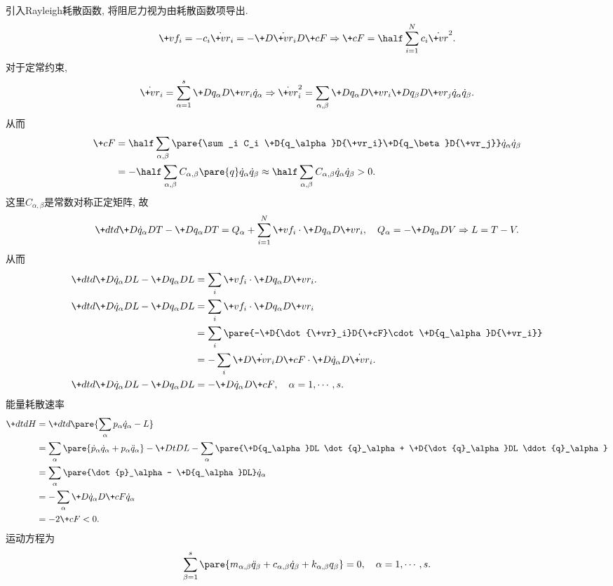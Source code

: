 \documentclass[../LectureNotes.tex]{subfiles}
\begin{document}
引入Rayleigh耗散函数, 将阻尼力视为由耗散函数项导出.
\[ \+vf_i = -c_i \dot{\+vr}_i = -\+D{\dot{\+vr}_i}D{\+cF} \Rightarrow \+cF = \half \sum_{i=1}^N c_i \dot{\+vr}^2. \]
对于定常约束,
\[ \dot{\+vr}_i = \sum_{\alpha=1}^s \+D{q_\alpha}D{\+vr_i} \dot{q}_\alpha \Rightarrow \dot{\+vr}_i^2 = \sum_{\alpha,\beta} \+D{q_\alpha}D{\+vr_i}\+D{q_\beta}D{\+vr_j}\dot{q}_\alpha \dot{q}_\beta. \]
从而
\begin{align*}
    \+cF &= \half\sum_{\alpha,\beta} \pare{\sum_i C_i \+D{q_\alpha}D{\+vr_i}\+D{q_\beta}D{\+vr_j}} \dot{q}_\alpha \dot{q}_\beta \\ &= -\half \sum_{\alpha,\beta} C_{\alpha,\beta}\pare{q} \dot{q}_\alpha \dot{q}_\beta \approx \half \sum_{\alpha,\beta} C_{\alpha,\beta} \dot{q}_\alpha \dot{q}_\beta > 0.
\end{align*}
这里$C_{\alpha,\beta}$是常数对称正定矩阵, 故
\[ \+dtd{} \+D{\dot{q}_\alpha}DT - \+D{q_\alpha}DT = Q_\alpha + \sum_{i=1}^N \+vf_i \cdot \+D{q_\alpha}D{\+vr_i},\quad Q_\alpha = -\+D{q_\alpha}DV \Rightarrow L=T-V. \]
从而
\begin{align*}
    \+dtd{} \+D{\dot{q}_\alpha}DL - \+D{q_\alpha}DL &= \sum_i \+vf_i \cdot \+D{q_\alpha}D{\+vr_i}. \\
    \+dtd{} \+D{\dot{q}_\alpha}DL - \+D{q_\alpha}DL &= \sum_i \+vf_i \cdot \+D{q_\alpha}D{\+vr_i} \\
    &= \sum_i \pare{-\+D{\dot{\+vr}_i}D{\+cF}\cdot \+D{q_\alpha}D{\+vr_i}} \\
    &= -\sum_i \+D{\dot{\+vr}_i}D{\+cF} \cdot \+D{\dot{q}_\alpha}D{\dot{\+vr}_i}. \\
    \+dtd{} \+D{\dot{q}_\alpha}DL - \+D{q_\alpha}DL &= - \+D{\dot{q}_\alpha}D{\+cF},\quad \alpha = 1,\cdots,s.
\end{align*}
能量耗散速率
\begin{align*}
    \+dtdH &= \+dtd{} \pare{\sum_\alpha p_\alpha \dot{q}_\alpha - L} \\
    &= \sum_\alpha \pare{\dot{p}_\alpha \dot{q}_\alpha + p_\alpha \ddot{q}_\alpha} - \+DtDL - \sum_\alpha\pare{\+D{q_\alpha}DL \dot{q}_\alpha + \+D{\dot{q}_\alpha}DL \ddot{q}_\alpha} \\
    &= \sum_\alpha \pare{\dot{p}_\alpha - \+D{q_\alpha}DL} \dot{q}_\alpha \\
    &= -\sum_\alpha \+D{\dot{q}_\alpha}D{\+cF} \dot{q}_\alpha \\
    &= -2\+cF < 0.
\end{align*}
运动方程为
\[ \sum_{\beta = 1}^s \pare{m_{\alpha,\beta}\ddot{q}_\beta + c_{\alpha,\beta}\dot{q}_\beta + k_{\alpha,\beta}q_\beta} = 0,\quad \alpha = 1,\cdots,s. \]
\end{document}
